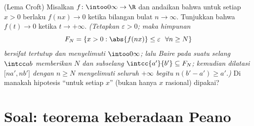 \begin{exercise}[$\star\star\star$]\label{exo:b3:complete:12}
(Lema Croft) Misalkan $f\colon\intoo0\infty\to\R$ 
dan andaikan bahwa untuk setiap $x > 0$ berlaku $f(nx) \to 0$ ketika
bilangan bulat $n \to \infty$. Tunjukkan bahwa $f(t) \to 0$ ketika $t \to
+\infty$. \emph{(Tetapkan $\varepsilon > 0$; maka himpunan
\[
F_N = \{x > 0 : \abs{f(nx)} \leq \varepsilon\ \ \forall n
\geq N\}
\]
bersifat tertutup dan menyelimuti $\intoo0\infty$; lalu Baire pada suatu selang
$\intcc ab$ memberikan $N$ dan subselang $\intcc{a'}{b'}
\subseteq F_N$; kemudian dilatasi $\bigl[na', nb'\bigr]$ dengan $n
\geq N$ menyelimuti seluruh  $+\infty$ begitu
$n(b' - a') \geq a'$.)} Di manakah hipotesis ``untuk setiap
$x$'' (bukan hanya $x$ rasional) dipakai?
\end{exercise}

\section{Soal: teorema keberadaan Peano}


